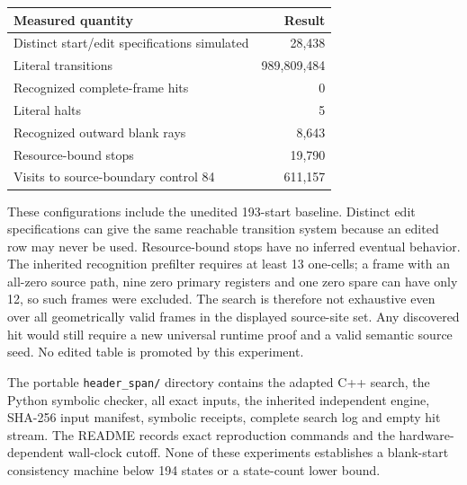 \begin{center}
\begin{tabular}{lr}
\toprule
Measured quantity & Result\\
\midrule
Distinct start/edit specifications simulated & 28,438\\
Literal transitions & 989,809,484\\
Recognized complete-frame hits & 0\\
Literal halts & 5\\
Recognized outward blank rays & 8,643\\
Resource-bound stops & 19,790\\
Visits to source-boundary control 84 & 611,157\\
\bottomrule
\end{tabular}
\end{center}

These configurations include the unedited 193-start baseline. Distinct
edit specifications can give the same reachable transition system because
an edited row may never be used. Resource-bound stops have no inferred
eventual behavior. The inherited recognition prefilter requires at least
13 one-cells; a frame with an all-zero source path, nine zero primary
registers and one zero spare can have only 12, so such frames were excluded.
The search is therefore not exhaustive even over all geometrically valid
frames in the displayed source-site set. Any discovered hit would still
require a new universal runtime proof and a valid semantic source seed.
No edited table is promoted by this experiment.

The portable \texttt{header\_span/} directory contains the adapted C++
search, the Python symbolic checker, all exact inputs, the inherited
independent engine, SHA-256 input manifest, symbolic receipts, complete
search log and empty hit stream. The README records exact reproduction
commands and the hardware-dependent wall-clock cutoff. None of these
experiments establishes a blank-start consistency machine below 194
states or a state-count lower bound.
